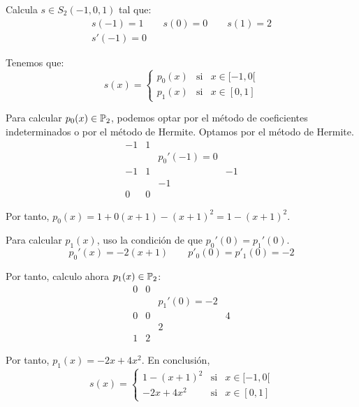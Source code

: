 \begin{ejemplo}
    Calcula $s\in S_2(-1, 0, 1)$ tal que:
    \begin{gather*}
        s(-1)=1 \qquad s(0)=0 \qquad s(1)=2 \\
        s'(-1)=0
    \end{gather*}

    Tenemos que:
    \begin{equation*}
        s(x)=\left\{\begin{array}{ccl}
            p_0(x) & \text{si} & x\in [-1, 0[ \\
            p_{1}(x) & \text{si} & x\in [0,1]
        \end{array} \right.
    \end{equation*}

    Para calcular $p_0(x)\in \mathbb{P}_2$, podemos optar por el método de coeficientes indeterminados o por el método de Hermite. Optamos por el método de Hermite.
    \begin{equation*}
        \begin{array}{c|ccccc}
            -1 & 1 \\
            && p_0'(-1)=0 \\ 
            -1 & 1 && -1\\
            && -1\\
            0 & 0
        \end{array}
    \end{equation*}

    Por tanto, $p_0(x)=1+0(x+1)-(x+1)^2 = 1-(x+1)^2$.

    Para calcular $p_1(x)$, uso la condición de que $p_0'(0)=p_1'(0)$.
    \begin{equation*}
        p_0'(x) = -2(x+1) \qquad p'_0(0)=p'_1(0)=-2
    \end{equation*}

    Por tanto, calculo ahora $p_1(x)\in \mathbb{P}_2$:
    \begin{equation*}
        \begin{array}{c|ccccc}
            0 & 0 \\
            && p_1'(0)=-2 \\ 
            0 & 0 && 4\\
            && 2\\
            1 & 2
        \end{array}
    \end{equation*}

    Por tanto, $p_1(x)=-2x+4x^2$. En conclusión,
    \begin{equation*}
        s(x)=\left\{\begin{array}{ccl}
            1-(x+1)^2 & \text{si} & x\in [-1, 0[ \\
            -2x+4x^2 & \text{si} & x\in [0,1]
        \end{array} \right.
    \end{equation*}
\end{ejemplo}



